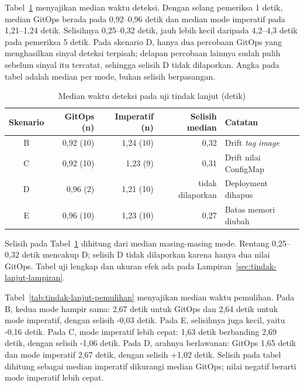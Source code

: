 Tabel~\ref{tab:tindak-lanjut-deteksi} menyajikan median waktu deteksi. Dengan selang pemeriksa 1 detik, median GitOps berada pada 0,92--0,96 detik dan median mode imperatif pada 1,21--1,24 detik. Selisihnya 0,25--0,32 detik, jauh lebih kecil daripada 4,2--4,3 detik pada pemeriksa 5 detik. Pada skenario D, hanya dua percobaan GitOps yang menghasilkan sinyal deteksi terpisah; delapan percobaan lainnya sudah pulih sebelum sinyal itu tercatat, sehingga selisih D tidak dilaporkan. Angka pada tabel adalah median per mode, bukan selisih berpasangan.

\begin{table}[H]
  \centering
  \small
  \caption{Median waktu deteksi pada uji tindak lanjut (detik)}
  \label{tab:tindak-lanjut-deteksi}
  \begin{tabularx}{\textwidth}{|c|r|r|r|>{\raggedright\arraybackslash}X|}
    \hline
    Skenario & GitOps (n) & Imperatif (n) & Selisih median & Catatan \\
    \hline
    B & 0,92 (10) & 1,24 (10) & 0,32 & Drift \textit{tag} \textit{image} \\
    \hline
    C & 0,92 (10) & 1,23 (9) & 0,31 & Drift nilai ConfigMap \\
    \hline
    D & 0,96 (2) & 1,21 (10) & tidak dilaporkan & Deployment dihapus \\
    \hline
    E & 0,96 (10) & 1,23 (10) & 0,27 & Batas memori diubah \\
    \hline
  \end{tabularx}
\end{table}

\noindent\footnotesize Selisih pada Tabel~\ref{tab:tindak-lanjut-deteksi} dihitung dari median masing-masing mode. Rentang 0,25--0,32 detik mencakup D; selisih D tidak dilaporkan karena hanya dua nilai GitOps. Tabel uji lengkap dan ukuran efek ada pada Lampiran~\ref{sec:tindak-lanjut-lampiran}.\normalsize

Tabel~\ref{tab:tindak-lanjut-pemulihan} menyajikan median waktu pemulihan. Pada B, kedua mode hampir sama: 2,67 detik untuk GitOps dan 2,64 detik untuk mode imperatif, dengan selisih -0,03 detik. Pada E, selisihnya juga kecil, yaitu -0,16 detik. Pada C, mode imperatif lebih cepat: 1,63 detik berbanding 2,69 detik, dengan selisih -1,06 detik. Pada D, arahnya berlawanan: GitOps 1,65 detik dan mode imperatif 2,67 detik, dengan selisih +1,02 detik. Selisih pada tabel dihitung sebagai median imperatif dikurangi median GitOps; nilai negatif berarti mode imperatif lebih cepat.

